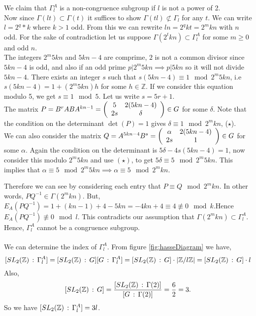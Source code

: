 \begin{example}
We claim that $\Gamma_{l}^A$ is a non-congruence subgroup if $l$ is not a power of 2.\\ 
Now since $\Gamma(lt) \subset \Gamma(t)$ it suffices to show $ \Gamma(tl) \not\subset \Gamma_l$ for any $t$. We can write $l = 2^q*k$ where $k >1$ odd. From this we can rewrite $ln = 2^q k t = 2^mkn$ with $n$ odd. For the sake of contradiction let us suppose $\Gamma(2^t kn) \subset \Gamma_{l}^A$ for some $m \geq 0$ and odd $n$. \\
The integers $2^m5kn$ and $5kn -4$ are comprime, $2$ is not a common divisor since $5kn -4$ is odd, and also if an odd prime $p \vert 2^m5kn \implies p\vert 5kn$ so it will not divide $5kn -4$. There exists an integer $s$ such that $s(5kn -4) \equiv 1 \mod 2^m5kn$, i.e $s(5kn -4) = 1 + (2^m5kn)h$ for some $h \in \mathbb{Z}$. If we consider this equation modulo 5, we get $s \equiv 1 \mod 5$. Let us write $s = 5r +1$. \\
The matrix $P = B^rABA^{kn-1} =  \left(\begin{array}{ c c } 5 & 2(5kn -4) \\ 2s & \delta \end{array} \right) \in G$ for some $\delta$. Note that the condition on the determinant $\det(P) = 1$ gives $\delta \equiv 1 \mod 2^mkn$, ($\star$). \\
We can also consider the matrix $Q = A^{5kn -4}B^s =  \left(\begin{array}{ c c } \alpha & 2(5kn -4) \\ 2s & 1 \end{array} \right) \in G$ for some $\alpha$. Again the condition on the determinant is $5\delta - 4s(5kn -4) =1$, now consider this modulo $2^m5kn$ and use $(\star)$, to get $5\delta \equiv 5 \mod 2^m5kn$. This implies that $\alpha \equiv 5 \mod 2^m5kn \implies \alpha \equiv 5 \mod 2^mkn$. 

Therefore we can see by considering each entry that $P \equiv Q \mod 2^mkn$. In other words, $PQ^{-1} \in \Gamma(2^mkn)$. But, $E_A(PQ^{-1}) = 1 + (kn-1) + 4 - 5kn = -4kn + 4 \equiv 4 \not \equiv 0 \mod k$.Hence $E_A(PQ^{-1}) \not\equiv 0 \mod l$. This contradicts our assumption that $\Gamma(2^mkn) \subset \Gamma_{l}^A$. Hence, $\Gamma_{l}^A$ cannot be a congruence subgroup.\\
\\
We can determine the index of $\Gamma_{l}^A$. From figure \ref{fig:hasseDiagram} we have, 
$$[\sltz \, : \,\Gamma_{l}^A]= [\sltz \, : \, G][G \, : \, \Gamma_{l}^A] =[\sltz \, : \, G]\cdot \vert \znz[l] \vert = [\sltz \, : \, G]\cdot l$$
Also,
$$ [\sltz \, : \, G] = \frac{[\sltz \, : \, \Gamma(2)]}{[G \, : \, \Gamma(2)]} = \frac{6}{2} =3.$$
So we have $[\sltz \, : \, \Gamma_{l}^A] = 3l$.
\end{example}

